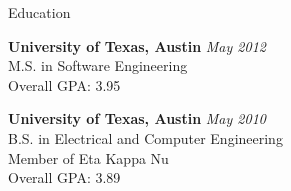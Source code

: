 \documentclass{resume} %
\begin{document}

\begin{rSection}{Education}

{\bf University of Texas, Austin} \hfill {\em May 2012 } \\ 
M.S. in Software Engineering \\
Overall GPA: 3.95

{\bf University of Texas, Austin} \hfill {\em May 2010 } \\ 
B.S. in Electrical and Computer Engineering \\
Member of Eta Kappa Nu \\
Overall GPA: 3.89

\end{rSection}

\end{document}
